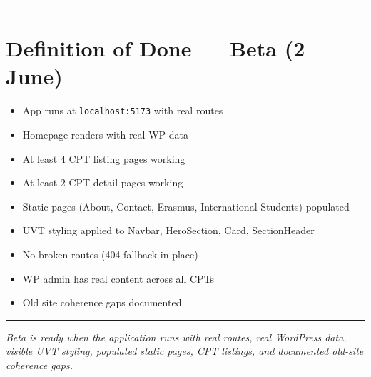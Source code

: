 \documentclass[11pt,a4paper]{article}
\newcommand{\grouprule}{\vspace{0.3em}\textcolor{ruleLine}{\rule{\linewidth}{0.4pt}}\vspace{0.3em}}
\begin{document}
\grouprule

\section{Definition of Done — Beta (2 June)}

\begin{itemize}
\item[$\square$] App runs at \nolinkurl{localhost:5173} with real routes
\item[$\square$] Homepage renders with real WP data
\item[$\square$] At least 4 CPT listing pages working
\item[$\square$] At least 2 CPT detail pages working
\item[$\square$] Static pages (About, Contact, Erasmus, International Students) populated
\item[$\square$] UVT styling applied to Navbar, HeroSection, Card, SectionHeader
\item[$\square$] No broken routes (404 fallback in place)
\item[$\square$] WP admin has real content across all CPTs
\item[$\square$] Old site coherence gaps documented
\end{itemize}
\vspace{1.2em}
\textcolor{uvtYellow}{\rule{\linewidth}{1.5pt}}

{\small\textit{Beta is ready when the application runs with real routes, real WordPress data, visible UVT styling, populated static pages, CPT listings, and documented old-site coherence gaps.}}
\end{document}
